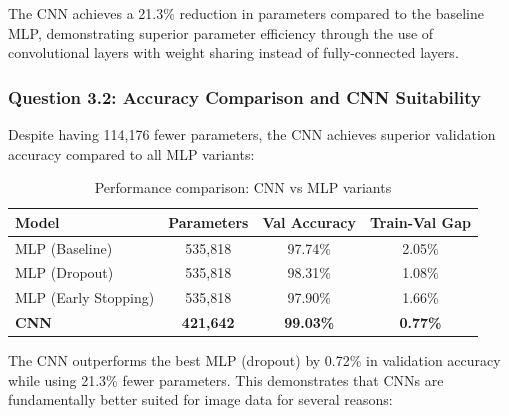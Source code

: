 The CNN achieves a 21.3\% reduction in parameters compared to the baseline MLP, demonstrating superior parameter efficiency through the use of convolutional layers with weight sharing instead of fully-connected layers.

\subsubsection{Question 3.2: Accuracy Comparison and CNN Suitability}

Despite having 114,176 fewer parameters, the CNN achieves superior validation accuracy compared to all MLP variants:

\begin{table}[h]
\centering
\begin{tabular}{|l|c|c|c|}
\hline
\textbf{Model}        & \textbf{Parameters} & \textbf{Val Accuracy} & \textbf{Train-Val Gap} \\ \hline
MLP (Baseline)        & 535,818             & 97.74\%               & 2.05\%                 \\ \hline
MLP (Dropout)         & 535,818             & 98.31\%               & 1.08\%                 \\ \hline
MLP (Early Stopping)  & 535,818             & 97.90\%               & 1.66\%                 \\ \hline
\textbf{CNN}          & \textbf{421,642}    & \textbf{99.03\%}      & \textbf{0.77\%}        \\ \hline
\end{tabular}
\caption{Performance comparison: CNN vs MLP variants}
\label{tab:cnn-performance}
\end{table}

The CNN outperforms the best MLP (dropout) by 0.72\% in validation accuracy while using 21.3\% fewer parameters. This demonstrates that CNNs are fundamentally better suited for image data for several reasons:

